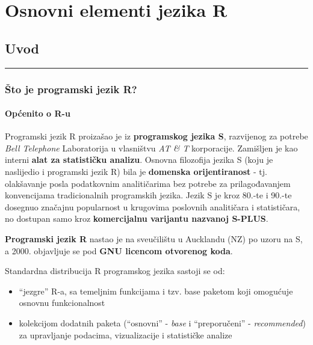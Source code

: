 \documentclass[]{book}
\providecommand{\tightlist}{%
  \setlength{\itemsep}{0pt}\setlength{\parskip}{0pt}}
\theoremstyle{definition}
\theoremstyle{definition}
\theoremstyle{definition}
\theoremstyle{remark}
\begin{document}
\part{Osnovni elementi jezika
R}\label{part-osnovni-elementi-jezika-r}

\chapter{Uvod}\label{uvod}

\begin{center}\rule{0.5\linewidth}{\linethickness}\end{center}

\section{Što je programski jezik R?}\label{sto-je-programski-jezik-r}

\subsection{Općenito o R-u}\label{opcenito-o-r-u}

Programski jezik R proizašao je iz \textbf{programskog jezika S},
razvijenog za potrebe \emph{Bell Telephone} Laboratorija u vlasništvu
\emph{AT \& T} korporacije. Zamišljen je kao interni \textbf{alat za
statističku analizu}. Osnovna filozofija jezika S (koju je naslijedio i
programski jezik R) bila je \textbf{domenska orijentiranost} - tj.
olakšavanje posla podatkovnim analitičarima bez potrebe za
prilagođavanjem konvencijama tradicionalnih programskih jezika. Jezik S
je kroz 80.-te i 90.-te dosegnuo značajnu popularnost u krugovima
poslovnih analitičara i statističara, no dostupan samo kroz
\textbf{komercijalnu varijantu nazvanoj S-PLUS}.

\textbf{Programski jezik R} nastao je na sveučilištu u Aucklandu (NZ) po
uzoru na S, a 2000. objavljuje se pod \textbf{GNU licencom otvorenog
koda}.

Standardna distribucija R programskog jezika sastoji se od:

\begin{itemize}
\tightlist
\item
  ``jezgre'' R-a, sa temeljnim funkcijama i tzv. base paketom koji
  omogućuje osnovnu funkcionalnost
\item
  kolekcijom dodatnih paketa (``osnovni'' - \emph{base} i
  ``preporučeni'' - \emph{recommended}) za upravljanje podacima,
  vizualizacije i statističke analize
\end{itemize}
\end{document}
